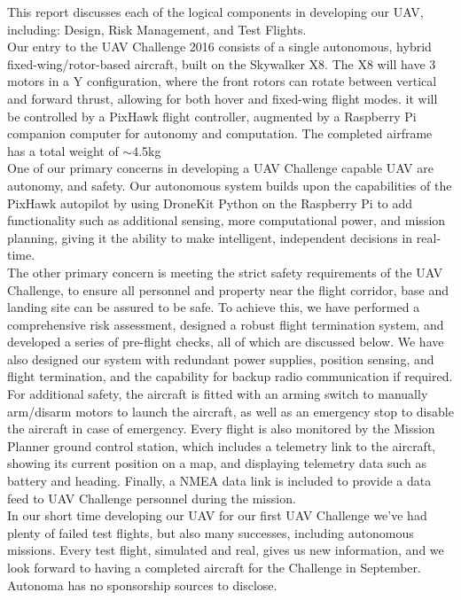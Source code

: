 \label{sec:intro}
This report discusses each of the logical components in developing our UAV, including: Design, Risk Management, and Test Flights.\\

Our entry to the UAV Challenge 2016 consists of a single autonomous, hybrid fixed-wing/rotor-based aircraft, built on the Skywalker X8. The X8 will have 3 motors in a Y configuration, where the front rotors can rotate between vertical and forward thrust, allowing for both hover and fixed-wing flight modes. it will be controlled by a PixHawk flight controller, augmented by a Raspberry Pi companion computer for autonomy and computation. The completed airframe has a total weight of $\sim$4.5kg\\

One of our primary concerns in developing a UAV Challenge capable UAV are autonomy, and safety. Our autonomous system builds upon the capabilities of the PixHawk autopilot by using DroneKit Python on the Raspberry Pi to add functionality such as additional sensing, more computational power, and mission planning, giving it the ability to make intelligent, independent decisions in real-time.\\

The other primary concern is meeting the strict safety requirements of the UAV Challenge, to ensure all personnel and property near the flight corridor, base and landing site can be assured to be safe. To achieve this, we have performed a comprehensive risk assessment, designed a robust flight termination system, and developed a series of pre-flight checks, all of which are discussed below. We have also designed our system with redundant power supplies, position sensing, and flight termination, and the capability for backup radio communication if required.\\

For additional safety, the aircraft is fitted with an arming switch to manually arm/disarm motors to launch the aircraft, as well as an emergency stop to disable the aircraft in case of emergency. Every flight is also monitored by the Mission Planner ground control station, which includes a telemetry link to the aircraft, showing its current position on a map, and displaying telemetry data such as battery and heading. Finally, a NMEA data link is included to provide a data feed to UAV Challenge personnel during the mission.\\

In our short time developing our UAV for our first UAV Challenge we've had plenty of failed test flights, but also many successes, including autonomous missions. Every test flight, simulated and real, gives us new information, and we look forward to having a completed aircraft for the Challenge in September.\\

Autonoma has no sponsorship sources to disclose.\\